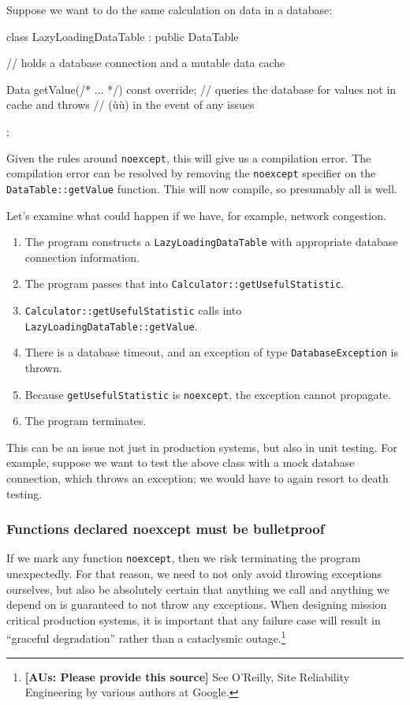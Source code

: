 \noindent Suppose we want to do the same calculation on data in a database:

\begin{emcppslisting}
class LazyLoadingDataTable : public DataTable
{
    // holds a database connection and a mutable data cache

    Data getValue(/* ... */) const override;
        // queries the database for values not in cache and throws
        // (ù{}ù) in the event of any issues
};
\end{emcppslisting}
    

\noindent Given the rules around \lstinline!noexcept!, this will give us a
compilation error. The compilation error can be resolved by removing the
\lstinline!noexcept! specifier on the \lstinline!DataTable::getValue!
function. This will now compile, so presumably all is well.

Let's examine what could happen if we have, for example, network
congestion.
\begin{enumerate}
\item{The program constructs a \lstinline!LazyLoadingDataTable! with appropriate database connection information.}
\item{The program passes that into \lstinline!Calculator::getUsefulStatistic!.}
\item{\lstinline!Calculator::getUsefulStatistic! calls into \lstinline!LazyLoadingDataTable::getValue!.}
\item{There is a database timeout, and an exception of type \lstinline!DatabaseException! is thrown.}
\item{Because \lstinline!getUsefulStatistic! is \lstinline!noexcept!, the exception cannot propagate.}
\item{The program terminates.}
\end{enumerate}
This can be an issue not just in production systems, but also in unit
testing. For example, suppose we want to test the above class with a
mock database connection, which throws an exception; we would have to
again resort to death testing.

\subsubsection[Functions declared \lstinline!noexcept! must be bulletproof]{Functions declared {\SubsubsecCode noexcept} must be bulletproof}\label{functions-declared-noexcept-must-be-bulletproof}

If we mark any function \lstinline!noexcept!, then we risk terminating the
program unexpectedly. For that reason, we need to not only avoid
throwing exceptions ourselves, but also be absolutely certain that
anything we call and anything we depend on is guaranteed to not throw
any exceptions. When designing mission critical production systems, it
is important that any failure case will result in ``graceful
degradation'' rather than a cataclysmic outage.{\cprotect\footnote{\textbf{[AUs: Please provide this source]} See
  O'Reilly, Site Reliability Engineering by various authors at Google.}}

